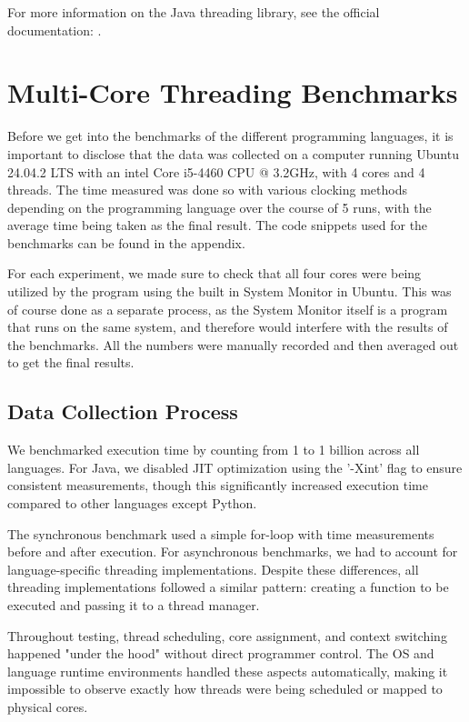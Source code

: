 \documentclass[12pt,a4paper]{article}
\begin{document}
For more information on the Java threading library, see the official documentation: .

\section{Multi-Core Threading Benchmarks}

Before we get into the benchmarks of the different programming languages, it is important to disclose that the data was collected on a computer running Ubuntu 24.04.2 LTS with an intel Core i5-4460 CPU @ 3.2GHz, with 4 cores and 4 threads. The time measured was done so with various clocking methods depending on the programming language over the course of 5 runs, with the average time being taken as the final result. The code snippets used for the benchmarks can be found in the appendix.

For each experiment, we made sure to check that all four cores were being utilized by the program using the built in System Monitor in Ubuntu. This was of course done as a separate process, as the System Monitor itself is a program that runs on the same system, and therefore would interfere with the results of the benchmarks. All the numbers were manually recorded and then averaged out to get the final results. 

\subsection{Data Collection Process}

We benchmarked execution time by counting from 1 to 1 billion across all languages. For Java, we disabled JIT optimization using the '-Xint' flag to ensure consistent measurements, though this significantly increased execution time compared to other languages except Python.

The synchronous benchmark used a simple for-loop with time measurements before and after execution. For asynchronous benchmarks, we had to account for language-specific threading implementations. Despite these differences, all threading implementations followed a similar pattern: creating a function to be executed and passing it to a thread manager.

Throughout testing, thread scheduling, core assignment, and context switching happened "under the hood" without direct programmer control. The OS and language runtime environments handled these aspects automatically, making it impossible to observe exactly how threads were being scheduled or mapped to physical cores.
\end{document}
